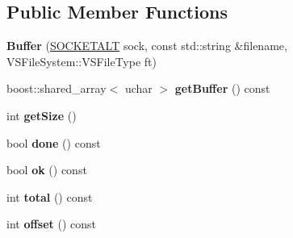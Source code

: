 \subsection*{Public Member Functions}
\begin{DoxyCompactItemize}
\item 
{\bfseries Buffer} (\hyperlink{classSOCKETALT}{S\+O\+C\+K\+E\+T\+A\+LT} sock, const std\+::string \&filename, V\+S\+File\+System\+::\+V\+S\+File\+Type ft)\hypertarget{classVsnetDownload_1_1Client_1_1Buffer_a72220934cf7a19afb2b19d80f2e03207}{}\label{classVsnetDownload_1_1Client_1_1Buffer_a72220934cf7a19afb2b19d80f2e03207}

\item 
boost\+::shared\+\_\+array$<$ uchar $>$ {\bfseries get\+Buffer} () const \hypertarget{classVsnetDownload_1_1Client_1_1Buffer_a7a3f3a437c9c23aec9eb0925e8a6d805}{}\label{classVsnetDownload_1_1Client_1_1Buffer_a7a3f3a437c9c23aec9eb0925e8a6d805}

\item 
int {\bfseries get\+Size} ()\hypertarget{classVsnetDownload_1_1Client_1_1Buffer_a3be13e0f1963d17dedb3a0e45e940f63}{}\label{classVsnetDownload_1_1Client_1_1Buffer_a3be13e0f1963d17dedb3a0e45e940f63}

\item 
bool {\bfseries done} () const \hypertarget{classVsnetDownload_1_1Client_1_1Buffer_ae35626d4876bb8e68d3f8247cba3747b}{}\label{classVsnetDownload_1_1Client_1_1Buffer_ae35626d4876bb8e68d3f8247cba3747b}

\item 
bool {\bfseries ok} () const \hypertarget{classVsnetDownload_1_1Client_1_1Buffer_a402e6174bb9f206aacbdf511031d8a77}{}\label{classVsnetDownload_1_1Client_1_1Buffer_a402e6174bb9f206aacbdf511031d8a77}

\item 
int {\bfseries total} () const \hypertarget{classVsnetDownload_1_1Client_1_1Buffer_a3b1df2bb066d8746d9c13a0d009cf0dc}{}\label{classVsnetDownload_1_1Client_1_1Buffer_a3b1df2bb066d8746d9c13a0d009cf0dc}

\item 
int {\bfseries offset} () const \hypertarget{classVsnetDownload_1_1Client_1_1Buffer_a34685d2bc1938a247eceda09ee2ce772}{}\label{classVsnetDownload_1_1Client_1_1Buffer_a34685d2bc1938a247eceda09ee2ce772}

\end{DoxyCompactItemize}
